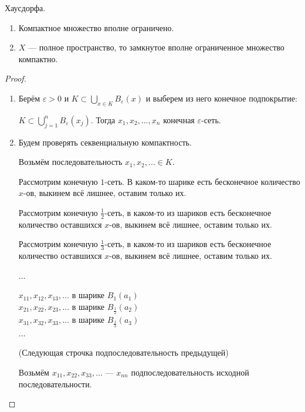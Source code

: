 \begin{theorem-non}
    Хаусдорфа.

    \begin{enumerate}
        \item Компактное множество вполне ограничено.
        \item $X$ --- полное пространство, то замкнутое вполне ограниченное множество компактно.
    \end{enumerate}

    \begin{proof} \quad  

        \begin{enumerate}
            \item Берём $\varepsilon > 0$  и $K \subset \bigcup\limits_{x \in K}B_{\varepsilon}(x)$ и выберем из него конечное подпокрытие:
            
            $K \subset \bigcup\limits_{j = 1}^n B_{\varepsilon}(x_j)$. Тогда $x_1, x_2, \dots, x_n$ конечная $\varepsilon$-сеть.

            \item 
            Будем проверять секвенциальную компактность.
            
            Возьмём последовательность $x_1, x_2, \dots \in K$.

            Рассмотрим конечную $1$-сеть.
            В каком-то шарике есть бесконечное количество $x$-ов, выкинем всё лишнее, оставим только их.
            
            Рассмотрим конечную $\frac{1}{2}$-сеть, в каком-то из шариков есть бесконечное количество оставшихся $x$-ов, выкинем всё лишнее, оставим только их.

            Рассмотрим конечную $\frac{1}{3}$-сеть, в каком-то из шариков есть бесконечное количество оставшихся $x$-ов, выкинем всё лишнее, оставим только их.

            $\dots$

            $x_{11}, x_{12}, x_{13}, \dots $ в шарике $B_1(a_1)$ \\
            $x_{21}, x_{22}, x_{23}, \dots $ в шарике $B_{\frac{1}{2}}(a_2)$ \\
            $x_{31}, x_{32}, x_{33}, \dots $ в шарике $B_{\frac{1}{3}}(a_3)$  \\
            $\dots$

            (Следующая строчка подпоследовательность предыдущей)

            Возьмём $x_{11}, x_{22}, x_{33}, \dots$ --- $x_{nn}$ подпоследовательность исходной последовательности.


\end{enumerate}
\end{proof}
\end{theorem-non}
